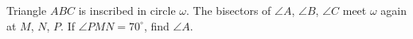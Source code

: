 Triangle $ABC$ is inscribed in circle $\omega$. The bisectors of $\angle A$, $\angle B$, $\angle C$ meet $\omega$ again at $M$, $N$, $P$. If $\angle PMN=70^\circ$, find $\angle A$.
